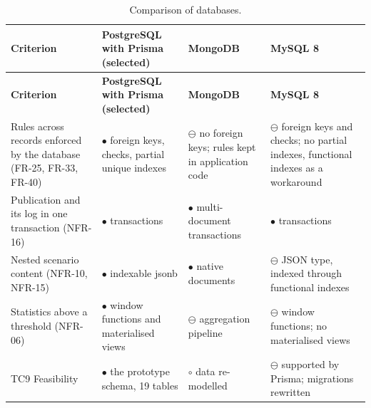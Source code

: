 {\small
\begin{longtable}{|>{\raggedright\arraybackslash}p{}|>{\raggedright\arraybackslash}p{}|>{\raggedright\arraybackslash}p{}|>{\raggedright\arraybackslash}p{}|}
\caption{Comparison of databases.} \\
\hline
\textbf{Criterion} & \textbf{PostgreSQL with Prisma (selected)} & \textbf{MongoDB\cite{r182}} & \textbf{MySQL 8\cite{r183}} \\ \hline
\endfirsthead
\hline
\textbf{Criterion} & \textbf{PostgreSQL with Prisma (selected)} & \textbf{MongoDB\cite{r182}} & \textbf{MySQL 8\cite{r183}} \\ \hline
\endhead
Rules across records enforced by the database (FR-25, FR-33, FR-40) & $\bullet$ foreign keys, checks, partial unique indexes\cite{r151} & $\ominus$ no foreign keys; rules kept in application code & $\ominus$ foreign keys and checks; no partial indexes, functional indexes as a workaround \\ \hline
Publication and its log in one transaction (NFR-16) & $\bullet$ transactions & $\bullet$ multi-\allowbreak{}document transactions\cite{r182} & $\bullet$ transactions \\ \hline
Nested scenario content (NFR-10, NFR-15) & $\bullet$ indexable jsonb\cite{r152} & $\bullet$ native documents & $\ominus$ JSON type, indexed through functional indexes \\ \hline
Statistics above a threshold (NFR-06) & $\bullet$ window functions and materialised views & $\ominus$ aggregation pipeline & $\ominus$ window functions; no materialised views \\ \hline
TC9 Feasibility & $\bullet$ the prototype schema, 19 tables & $\circ$ data re-modelled & $\ominus$ supported by Prisma; migrations rewritten \\ \hline
\end{longtable}
}

